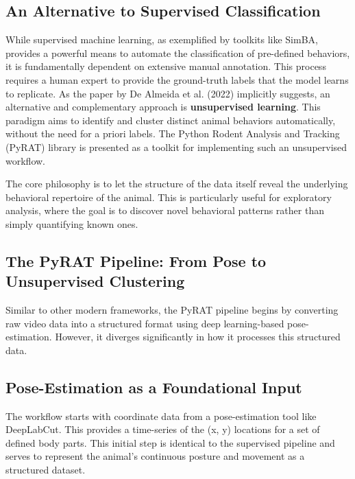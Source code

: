 \subsection{An Alternative to Supervised Classification}

While supervised machine learning, as exemplified by toolkits like SimBA, provides a powerful means to automate the classification of pre-defined behaviors, it is fundamentally dependent on extensive manual annotation. This process requires a human expert to provide the ground-truth labels that the model learns to replicate. As the paper by De Almeida et al. (2022) implicitly suggests, an alternative and complementary approach is \textbf{unsupervised learning}. This paradigm aims to identify and cluster distinct animal behaviors automatically, without the need for a priori labels. The Python Rodent Analysis and Tracking (PyRAT) library is presented as a toolkit for implementing such an unsupervised workflow.

The core philosophy is to let the structure of the data itself reveal the underlying behavioral repertoire of the animal. This is particularly useful for exploratory analysis, where the goal is to discover novel behavioral patterns rather than simply quantifying known ones.

\subsection{The PyRAT Pipeline: From Pose to Unsupervised Clustering}

Similar to other modern frameworks, the PyRAT pipeline begins by converting raw video data into a structured format using deep learning-based pose-estimation. However, it diverges significantly in how it processes this structured data.

\subsection{Pose-Estimation as a Foundational Input}
The workflow starts with coordinate data from a pose-estimation tool like DeepLabCut. This provides a time-series of the (x, y) locations for a set of defined body parts. This initial step is identical to the supervised pipeline and serves to represent the animal's continuous posture and movement as a structured dataset.

